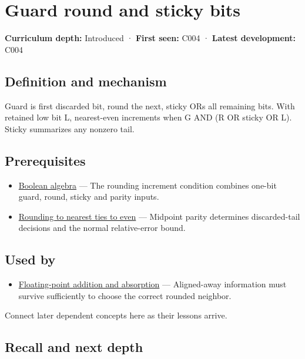 \hypertarget{appendix-b572b631069b}{}
\section{Guard round and sticky bits}\label{appendix-b572b631069b-guard-round-and-sticky-bits}

\textbf{Curriculum depth:} Introduced · \textbf{First seen:} C004 · \textbf{Latest development:} C004

\subsection{Definition and mechanism}\label{appendix-b572b631069b-definition-and-mechanism}

Guard is first discarded bit, round the next, sticky ORs all remaining bits. With retained low bit L, nearest-even increments when G AND (R OR sticky OR L). Sticky summarizes any nonzero tail.

\subsection{Prerequisites}\label{appendix-b572b631069b-prerequisites}

\begin{itemize}
\tightlist
\item
  \hyperref[appendix-24475e1596a8]{Boolean algebra} --- The rounding increment condition combines one-bit guard, round, sticky and parity inputs.
\item
  \hyperref[appendix-614afe1de592]{Rounding to nearest ties to even} --- Midpoint parity determines discarded-tail decisions and the normal relative-error bound.
\end{itemize}

\subsection{Used by}\label{appendix-b572b631069b-used-by}

\begin{itemize}
\tightlist
\item
  \hyperref[appendix-a1b1b4580dfd]{Floating-point addition and absorption} --- Aligned-away information must survive sufficiently to choose the correct rounded neighbor.
\end{itemize}

Connect later dependent concepts here as their lessons arrive.

\subsection{Recall and next depth}\label{appendix-b572b631069b-recall-and-next-depth}

